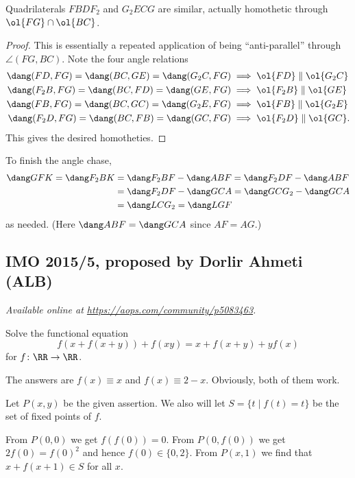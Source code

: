 \documentclass[11pt]{scrartcl}
\begin{document}
\begin{claim*}
  Quadrilaterals $FBDF_2$ and $G_2ECG$ are similar,
  actually homothetic through $\ol{FG} \cap \ol{BC}$.
\end{claim*}
\begin{proof}
  This is essentially a repeated application
  of being ``anti-parallel'' through $\angle(FG, BC)$.
  Note the four angle relations
  \begin{align*}
    \dang(FD, FG) = \dang(BC,GE) = \dang(G_2C,FG)
      &\implies \ol{FD} \parallel \ol{G_2C} \\
    \dang(F_2B, FG) = \dang(BC,FD) = \dang(GE,FG)
      &\implies \ol{F_2B} \parallel \ol{GE} \\
    \dang(FB, FG)  = \dang(BC,GC) = \dang(G_2E,FG)
      &\implies \ol{FB} \parallel \ol{G_2E} \\
    \dang(F_2D, FG)  = \dang(BC,FB) = \dang(GC,FG)
      &\implies \ol{F_2D} \parallel \ol{GC}.
  \end{align*}
  This gives the desired homotheties.
\end{proof}
To finish the angle chase,
\begin{align*}
  \dang GFK = \dang F_2BK &= \dang F_2BF - \dang ABF
  = \dang F_2DF - \dang ABF \\
  &= \dang F_2DF - \dang GCA
  = \dang GCG_2 - \dang GCA \\
  &=  \dang LCG_2 = \dang LGF
\end{align*}
as needed.
(Here $\dang ABF = \dang GCA$ since $AF = AG$.)
\pagebreak

\subsection{IMO 2015/5, proposed by Dorlir Ahmeti (ALB)}
\textsl{Available online at \url{https://aops.com/community/p5083463}.}
\begin{mdframed}[style=mdpurplebox,frametitle={Problem statement}]
Solve the functional equation
\[ f(x+f(x+y)) + f(xy) = x + f(x+y) + yf(x) \]
for $f \colon \RR \to \RR$.
\end{mdframed}
The answers are $f(x) \equiv x$ and $f(x) \equiv 2-x$.
Obviously, both of them work.

Let $P(x,y)$ be the given assertion.
We also will let $S = \{t \mid f(t) = t\}$
be the set of fixed points of $f$.
\begin{itemize}
  \ii From $P(0,0)$ we get $f(f(0)) = 0$.
  \ii From $P(0,f(0))$ we get $2f(0) = f(0)^2$
  and hence $f(0) \in \{0,2\}$.
  \ii From $P(x,1)$
  we find that $x+f(x+1) \in S$ for all $x$.
\end{itemize}
\end{document}
